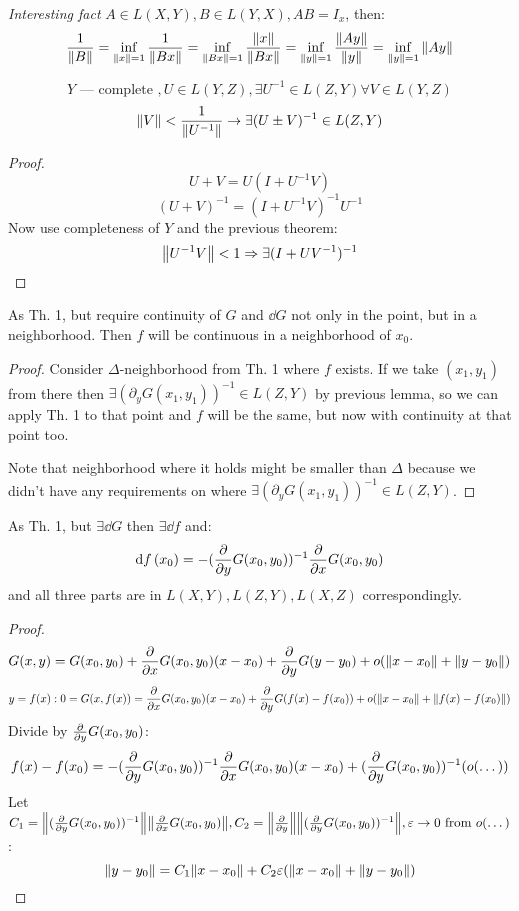 \textit{Interesting fact} $A \in L(X, Y), B \in L(Y, X), AB = I_x$, then:
\[ \frac{1}{\norm{B}} = \inf\limits_{\norm{x}=1} \frac{1}{\norm{Bx}} = 
 \inf\limits_{\norm{Bx} = 1} \frac{\norm{x}}{\norm{Bx}} = 
\inf\limits_{\norm{y}=1} \frac{\norm{Ay}}{\norm{y}} = \inf\limits_{\norm{y}=1} \norm{Ay} \]

\begin{thr} 
    \[ Y\text{ --- complete }, U \in L(Y, Z), \exists U^{-1} \in L(Z, Y) \forall V \in L(Y, Z) \] 
    \[ \norm{V} < \dfrac{1}{\norm{U^{-1}}} \to \exists (U \pm V)^{-1} \in L(Z, Y) \]
\end{thr}
\begin{proof}
    \[U + V = U(I + U^{-1}V)\]
    \[(U+V)^{-1} = (I +  U^{-1}V)^{-1} U^{-1}\]
    Now use completeness of $Y$ and the previous theorem:
    \[\norm{U^{-1}V} < 1 \Rightarrow \exists (I + UV^{-1})^{-1}\]
\end{proof}

\begin{thr}
    As Th. 1, but require continuity of $G$ and $\dd{G}$ not only in the point,
    but in a neighborhood. Then $f$ will be continuous in a neighborhood of $x_0$.
\end{thr}

\begin{proof}
    Consider $\Delta$-neighborhood from Th. 1 where $f$ exists. 
    If we take $(x_1, y_1)$  from there then
     $\exists (\partial_y G(x_1, y_1))^{-1} \in L(Z, Y)$ by previous lemma, so 
     we can apply Th. 1 to that point and $f$ will be the same, but now with 
     continuity at that point too.

     Note that neighborhood where it holds might be smaller than $\Delta$ because 
     we didn't have any requirements on where $\exists (\partial_y G(x_1, y_1))^{-1} \in L(Z, Y)$.
\end{proof}

\begin{thr}
    As Th. 1, but $\exists \dd{G}$ then $\exists \dd{f}$ and:
    \[ \dd{f}\/(x_0) = -(\pdv{y} G(x_0, y_0))^{-1}\pdv{x}G(x_0, y_0) \] 
    and all three parts are in $L(X, Y), L(Z, Y), L(X, Z)$ correspondingly.
\end{thr}

\begin{proof}
    \[ G(x, y) = G(x_0, y_0) + \pdv{x}G(x_0, y_0)(x-x_0) + \pdv{y}G(y - y_0) + o(\norm{x - x_0} + \norm{y - y_0}) \] 
    \[ y = f(x): 0 = G(x, f(x)) = \pdv{x}G(x_0, y_0)(x-x_0) + \pdv{y}G(f(x) - f(x_0)) + o(\norm{x - x_0} + \norm{f(x) - f(x_0)}) \] 
    Divide by $\pdv{y}G(x_0, y_0)$:
    \[ f(x) - f(x_0) = -(\pdv{y}G(x_0, y_0))^{-1} \pdv{x}G(x_0, y_0) (x - x_0) + (\pdv{y}G(x_0, y_0))^{-1}(o(\dots)) \] 
    Let $C_1 = \norm{(\pdv{y}G(x_0, y_0))^{-1}} \norm{\pdv{x}G(x_0, y_0)}, C_2 = \norm{\pdv{y}} \norm{(\pdv{y}G(x_0, y_0))^{-1}}, \varepsilon \to 0 \text{ from } o(\dots)$:
    \[ \norm{y - y_0} = C_1 \norm{x - x_0} + C_2 \varepsilon (\norm{x - x_0} + \norm{y - y_0}) \] 
\end{proof}

